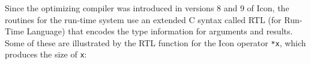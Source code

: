 Since the optimizing compiler was introduced in versions 8 and 9 of
Icon, the routines for the run-time system use an extended C syntax
called RTL (for Run-Time Language) that encodes the type information
for arguments and results. Some of these are illustrated by the RTL
function for the Icon operator \texttt{*x}, which produces the size of
\texttt{x}:

